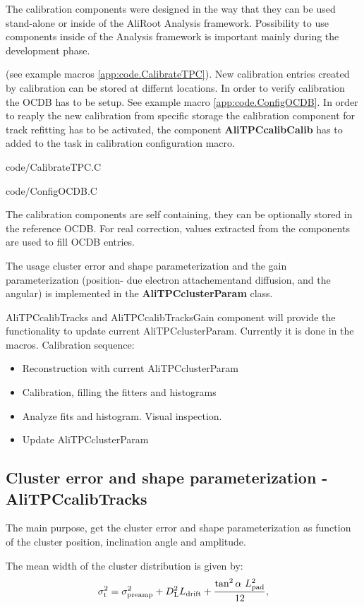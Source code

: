 \documentclass[a4paper,12pt]{article}
\newcommand{\CodeMacro}[2]
{
  
{code/#1}
}
\begin{document}
The calibration components were designed in the way that they can be used stand-alone or 
inside of the AliRoot Analysis framework. Possibility to use components inside of the Analysis 
framework is important mainly during the development phase.

(see example macros \ref{app:code.CalibrateTPC}).
New calibration entries created by calibration can be stored at differnt locations. In order to verify calibration the OCDB has to be setup. See example macro \ref{app:code.ConfigOCDB}. In order to reaply the new calibration from specific storage the calibration component for track refitting has to be activated, the component {\bf{AliTPCcalibCalib}} has to added to the task in calibration configuration macro. 
\CodeMacro{CalibrateTPC.C}{app:code.CalibrateTPC}
\CodeMacro{ConfigOCDB.C}{app:code.ConfigOCDB}


The calibration components are self containing, they can be optionally stored in the reference OCDB. For real correction, values extracted from the components are used to fill OCDB entries.



The usage cluster error and shape parameterization and the gain parameterization (position- due electron attachementand  diffusion, and the angular) is implemented in the {\bf{AliTPCclusterParam}} class.


AliTPCcalibTracks and AliTPCcalibTracksGain component will provide the functionality to update current AliTPCclusterParam. Currently it is done in the macros. Calibration sequence:
\begin{itemize}
\item Reconstruction with current AliTPCclusterParam
\item Calibration, filling the fitters and histograms
\item Analyze fits and histogram. Visual inspection.
\item Update AliTPCclusterParam 
\end{itemize}


\subsection{Cluster error and shape parameterization - AliTPCcalibTracks}

The main purpose, get the cluster error and shape parameterization as function of the cluster position, inclination angle and amplitude. 

The mean width of the cluster distribution is given by:
\begin{equation}
     \sigma_{\rm{t}}^2 = \sigma^2_{\rm{preamp}}+D{\rm{^2_L}}L_{\rm{drift}}+
        \frac{\tan^2\alpha~L_{\rm{pad}}^2}{12},
\end{equation}
\end{document}
